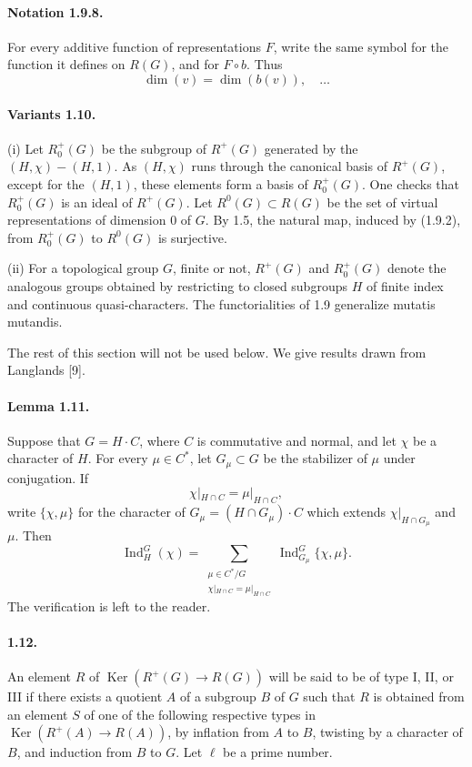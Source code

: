 \documentclass[10pt,letterpaper]{article}
\newcommand{\Ind}{\operatorname{Ind}}
\providecommand{\Ker}{\operatorname{Ker}}
\providecommand{\Ind}{\operatorname{Ind}}
\providecommand{\Ker}{\operatorname{Ker}}
\begin{document}
\paragraph{Notation 1.9.8.} For every additive function of representations \(F\), write the same symbol for the function it defines on \(R(G)\), and for \(F\circ b\). Thus
\[
\dim(v)=\dim(b(v)),\quad\ldots
\]

\paragraph{Variants 1.10.} (i) Let \(R^+_0(G)\) be the subgroup of \(R^+(G)\) generated by the \((H,\chi)-(H,1)\). As \((H,\chi)\) runs through the canonical basis of \(R^+(G)\), except for the \((H,1)\), these elements form a basis of \(R^+_0(G)\). One checks that \(R^+_0(G)\) is an ideal of \(R^+(G)\). Let \(R^0(G)\subset R(G)\) be the set of virtual representations of dimension \(0\) of \(G\). By 1.5, the natural map, induced by (1.9.2), from \(R^+_0(G)\) to \(R^0(G)\) is surjective.

(ii) For a topological group \(G\), finite or not, \(R^+(G)\) and \(R^+_0(G)\) denote the analogous groups obtained by restricting to closed subgroups \(H\) of finite index and continuous quasi-characters. The functorialities of 1.9 generalize mutatis mutandis.

The rest of this section will not be used below. We give results drawn from Langlands [9].

\paragraph{Lemma 1.11.} Suppose that \(G=H\cdot C\), where \(C\) is commutative and normal, and let \(\chi\) be a character of \(H\). For every \(\mu\in C^*\), let \(G_\mu\subset G\) be the stabilizer of \(\mu\) under conjugation. If
\[
\chi|_{H\cap C}=\mu|_{H\cap C},
\]
write \(\{\chi,\mu\}\) for the character of \(G_\mu=(H\cap G_\mu)\cdot C\) which extends \(\chi|_{H\cap G_\mu}\) and \(\mu\). Then
\[
\Ind_H^G(\chi)=
\sum_{\substack{\mu\in C^*/G\\ \chi|_{H\cap C}=\mu|_{H\cap C}}}
\Ind_{G_\mu}^G\{\chi,\mu\}.
\]
The verification is left to the reader.

\paragraph{1.12.} An element \(R\) of \(\Ker(R^+(G)\to R(G))\) will be said to be of type I, II, or III if there exists a quotient \(A\) of a subgroup \(B\) of \(G\) such that \(R\) is obtained from an element \(S\) of one of the following respective types in \(\Ker(R^+(A)\to R(A))\), by inflation from \(A\) to \(B\), twisting by a character of \(B\), and induction from \(B\) to \(G\). Let \(\ell\) be a prime number.
\end{document}

